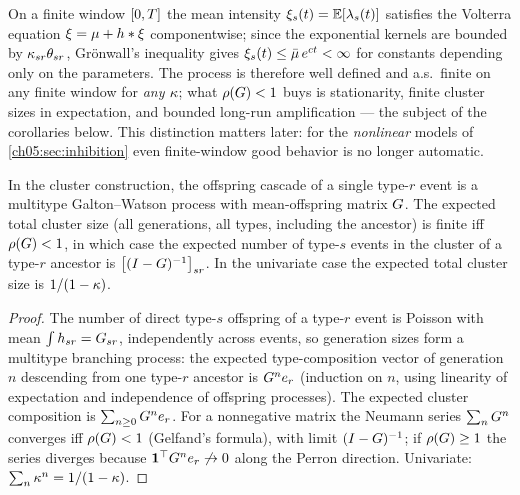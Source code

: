 \begin{remark}\label{rem:ch05:nonexplosion}
On a finite window $[0,T]$ the mean intensity $\xi_s(t) =
\mathbb{E}[\lambda_s(t)]$ satisfies the Volterra equation $\xi = \mu + h *
\xi$ componentwise; since the exponential kernels are bounded by
$\kappa_{sr}\theta_{sr}$, Gr\"onwall's inequality gives $\xi_s(t) \le
\bar{\mu}\, e^{c t} < \infty$ for constants depending only on the
parameters. The process is therefore well defined and a.s.\ finite on any
finite window for \emph{any} $\kappa$; what $\rho\!\left(G\right)<1$ buys is
stationarity, finite cluster sizes in expectation, and bounded long-run
amplification --- the subject of the corollaries below. This distinction
matters later: for the \emph{nonlinear} models of
\cref{ch05:sec:inhibition} even finite-window good behavior is no longer
automatic.
\end{remark}

\begin{corollary}\label{cor:ch05:subcritical}
In the cluster construction, the offspring cascade of a single type-$r$
event is a multitype Galton--Watson process with mean-offspring matrix
$G$. The expected total cluster size (all generations, all types,
including the ancestor) is finite iff $\rho\!\left(G\right) < 1$, in which case
the expected number of type-$s$ events in the cluster of a type-$r$
ancestor is $\big[(I - G)^{-1}\big]_{sr}$. In the univariate case the
expected total cluster size is $1/(1-\kappa)$.
\end{corollary}

\begin{proof}
The number of direct type-$s$ offspring of a type-$r$ event is Poisson
with mean $\int h_{sr} = G_{sr}$, independently across events,
so generation sizes form a multitype branching process: the expected
type-composition vector of generation $n$ descending from one type-$r$
ancestor is $G^{n} e_r$ (induction on $n$, using linearity of
expectation and independence of offspring processes). The expected cluster
composition is $\sum_{n \ge 0} G^{n} e_r$. For a nonnegative matrix
the Neumann series $\sum_n G^n$ converges iff $\rho\!\left(G\right) < 1$
(Gelfand's formula), with limit $(I-G)^{-1}$; if $\rho\!\left(G\right) \ge
1$ the series diverges because $\mathbf{1}^\top G^n e_r \not\to 0$
along the Perron direction. Univariate: $\sum_n \kappa^n =
1/(1-\kappa)$.
\end{proof}

